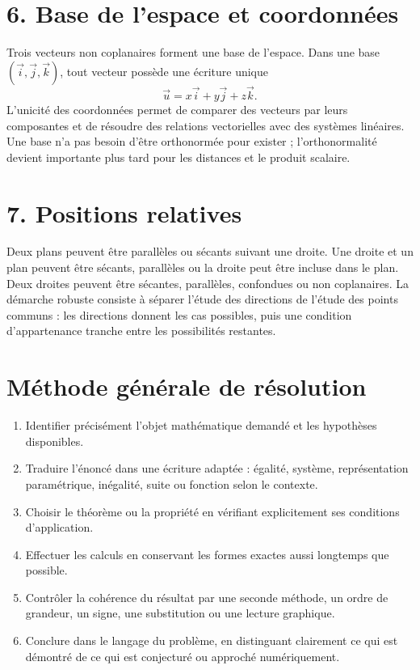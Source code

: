 \section{6. Base de l’espace et coordonnées}
Trois vecteurs non coplanaires forment une base de l'espace. Dans une base $(\vec i,\vec j,\vec k)$, tout vecteur possède une écriture unique
\[
\vec u=x\vec i+y\vec j+z\vec k.
\]
L'unicité des coordonnées permet de comparer des vecteurs par leurs composantes et de résoudre des relations vectorielles avec des systèmes linéaires. Une base n'a pas besoin d'être orthonormée pour exister ; l'orthonormalité devient importante plus tard pour les distances et le produit scalaire.

\section{7. Positions relatives}
Deux plans peuvent être parallèles ou sécants suivant une droite. Une droite et un plan peuvent être sécants, parallèles ou la droite peut être incluse dans le plan. Deux droites peuvent être sécantes, parallèles, confondues ou non coplanaires. La démarche robuste consiste à séparer l'étude des directions de l'étude des points communs : les directions donnent les cas possibles, puis une condition d'appartenance tranche entre les possibilités restantes.


\section{Méthode générale de résolution}
\begin{methode}
\begin{enumerate}
\item Identifier précisément l'objet mathématique demandé et les hypothèses disponibles.
\item Traduire l'énoncé dans une écriture adaptée : égalité, système, représentation paramétrique, inégalité, suite ou fonction selon le contexte.
\item Choisir le théorème ou la propriété en vérifiant explicitement ses conditions d'application.
\item Effectuer les calculs en conservant les formes exactes aussi longtemps que possible.
\item Contrôler la cohérence du résultat par une seconde méthode, un ordre de grandeur, un signe, une substitution ou une lecture graphique.
\item Conclure dans le langage du problème, en distinguant clairement ce qui est démontré de ce qui est conjecturé ou approché numériquement.
\end{enumerate}
\end{methode}

